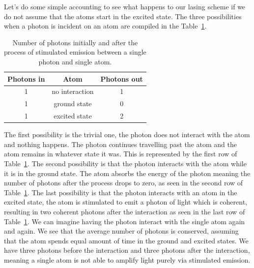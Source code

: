 Let's do some simple accounting to see what happens to our lasing scheme if we do not assume that the atoms start in the excited state.
The three possibilities when a photon is incident on an atom are compiled in the Table~\ref{tab:5-3_three_possibilities}.
\begin{table}[h]
    \centering
    \begin{tabular}{c|c|c}
        Photons in & Atom & Photons out \\
        \hline
        1 & no interaction & 1 \\
        \hline
        1 & ground state & 0 \\
        1 & excited state & 2 \\
    \end{tabular}
    \caption[Stimulated emission accounting]{Number of photons initially and after the process of stimulated emission between a single photon and single atom.}
    \label{tab:5-3_three_possibilities}
\end{table}
The first possibility is the trivial one, the photon does not interact with the atom and nothing happens.
The photon continues travelling past the atom and the atom remains in whatever state it was.
This is represented by the first row of Table~\ref{tab:5-3_three_possibilities}.
The second possibility is that the photon interacts with the atom while it is in the ground state.
The atom absorbs the energy of the photon meaning the number of photons after the process drops to zero, as seen in the second row of Table~\ref{tab:5-3_three_possibilities}.
The last possibility is that the photon interacts with an atom in the excited state, the atom is stimulated to emit a photon of light which is coherent, resulting in two coherent photons after the interaction as seen in the last row of Table~\ref{tab:5-3_three_possibilities}.
We can imagine having the photon interact with the single atom again and again.
We see that the average number of photons is conserved, assuming that the atom spends equal amount of time in the ground and excited states.
We have three photons before the interaction and three photons after the interaction, meaning a single atom is not able to amplify light purely via stimulated emission.

